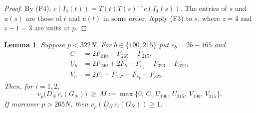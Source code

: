 \documentclass{amsart}
\newtheorem{lemma}{Lemma}[section]
\numberwithin{equation}{section}
\numberwithin{table}{section}
\begin{document}
\begin{proof}
By (F4), $c(I_4(t))=T(t)T(s)^{-1}c(I_4(s))$. The entries of $s$ and $u(s)$
are those of $t$ and $u(t)$ in some order. Apply (F3) to $s$, where $z=4$ and
$z-1=3$ are units at $p$.
\end{proof}

\begin{lemma}\label{lem:gains}
Suppose $p<322N$. For $b\in\{190,215\}$ put $e_b=2b-165$ and
\begin{align*}
C&=2F_{240}-F_{265}-F_{215},\\
U_b&=2F_{240}+2F_b-F_{e_b}-F_{323}-F_{322},\\
V_b&=2F_b+F_{157}-F_{e_b}-F_{322}.
\end{align*}
Then, for $i=1,2$,
\begin{equation}\label{eq:M}
v_p\bigl(D_N\,c_i(G_N)\bigr)\ \ge\ M:=\max\{0,\,C,\,U_{190},\,U_{215},\,V_{190},\,V_{215}\}.
\end{equation}
If moreover $p>265N$, then $v_p(D_N\,c_i(G_N))\ge1$.
\end{lemma}
\end{document}
